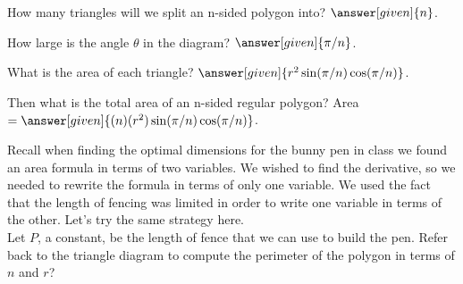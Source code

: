 \documentclass[handout,nooutcomes]{ximera}
\begin{document}
\begin{center}
\usetikzlibrary{calc,patterns,angles,quotes}
\end{center}

How many triangles will we split an n-sided polygon into? $\answer[given]{n}$.

How large is the angle $\theta$ in the diagram? $\answer[given]{\pi/n}$.

What is the area of each triangle? $\answer[given]{r^2\sin(\pi/n)\cos(\pi/n)}$.

Then what is the total area of an n-sided regular polygon? Area $=\answer[given]{(n)(r^2)\sin(\pi/n)\cos(\pi/n)}$.

\bigskip

\hspace{2cm}Recall when finding the optimal dimensions for the bunny pen in class we found an area formula in terms of two variables. We wished to find the derivative, so we needed to rewrite the formula in terms of only one variable. We used the fact that the length of fencing was limited in order to write one variable in terms of the other. Let's try the same strategy here.\\
Let $P$, a constant, be the length of fence that we can use to build the pen. Refer back to the triangle diagram to compute the perimeter of the polygon in terms of $n$ and $r$?
\end{document}
